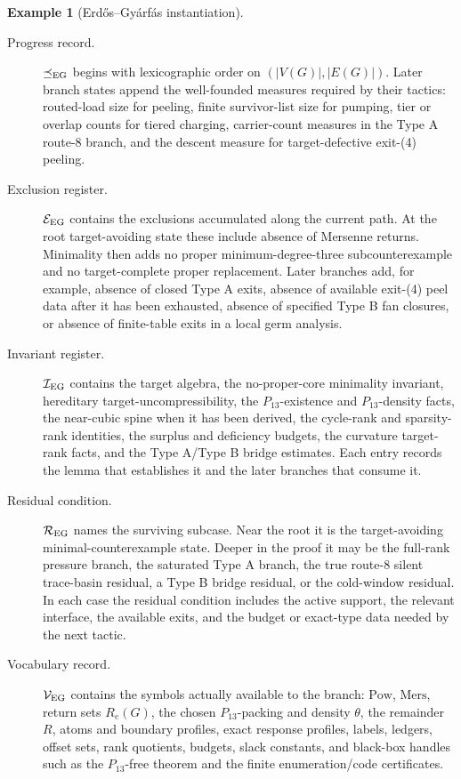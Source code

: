 \documentclass[
  11pt,
]{article}
\theoremstyle{definition}
\newtheorem{example}{Example}[section]
\begin{document}
\begin{example}[Erdős--Gyárfás instantiation]
\begin{description}
\item[Progress record.]
\(\preceq_{\rm EG}\) begins with lexicographic order on
\((|V(G)|,|E(G)|)\).  Later branch states append the well-founded
measures required by their tactics: routed-load size for peeling,
finite survivor-list size for pumping, tier or overlap counts for
tiered charging, carrier-count measures in the Type A route-8 branch,
and the descent measure for target-defective exit-(4) peeling.

\item[Exclusion register.]
\(\mathcal E_{\rm EG}\) contains the exclusions accumulated along the
current path.  At the root target-avoiding state these include absence
of Mersenne returns.  Minimality then adds no proper minimum-degree-three
subcounterexample and no target-complete proper replacement.  Later
branches add, for example, absence of closed Type A exits, absence of
available exit-(4) peel data after it has been exhausted, absence of
specified Type B fan closures, or absence of finite-table exits in a
local germ analysis.

\item[Invariant register.]
\(\mathcal I_{\rm EG}\) contains the target algebra, the no-proper-core
minimality invariant, hereditary target-uncompressibility, the
\(P_{13}\)-existence and \(P_{13}\)-density facts, the near-cubic spine
when it has been derived, the cycle-rank and sparsity-rank identities,
the surplus and deficiency budgets, the curvature target-rank facts, and
the Type A/Type B bridge estimates.  Each entry records the lemma that
establishes it and the later branches that consume it.

\item[Residual condition.]
\(\mathcal R_{\rm EG}\) names the surviving subcase.  Near the root it is
the target-avoiding minimal-counterexample state.  Deeper in the proof
it may be the full-rank pressure branch, the saturated Type A branch,
the true route-8 silent trace-basin residual, a Type B bridge residual,
or the cold-window residual.  In each case the residual condition
includes the active support, the relevant interface, the available exits,
and the budget or exact-type data needed by the next tactic.

\item[Vocabulary record.]
\(\mathcal V_{\rm EG}\) contains the symbols actually available to the
branch: \(\mathrm{Pow}\), \(\mathrm{Mers}\), return sets \(R_e(G)\), the
chosen \(P_{13}\)-packing and density \(\theta\), the remainder \(R\),
atoms and boundary profiles, exact response profiles, labels, ledgers,
offset sets, rank quotients, budgets, slack constants, and black-box
handles such as the \(P_{13}\)-free theorem and the finite
enumeration/code certificates.


\end{description}
\end{example}
\end{document}
